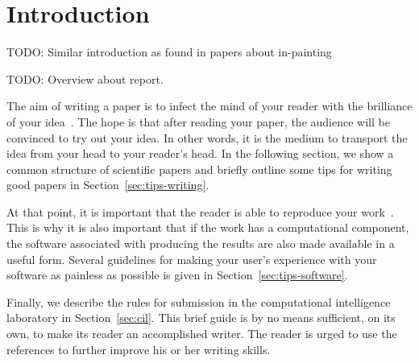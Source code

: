\section{Introduction}
\label{sec:introduction}
TODO: Similar introduction as found in papers about in-painting

TODO: Overview about report.

The aim of writing a paper is to infect the mind of your reader with
the brilliance of your idea~\cite{jones08}. 
The hope is that after reading your
paper, the audience will be convinced to try out your idea. In other
words, it is the medium to transport the idea from your head to your
reader's head. 
In the following
section, we show a common structure of scientific papers and briefly
outline some tips for writing good papers in
Section~\ref{sec:tips-writing}.

At that
point, it is important that the reader is able to reproduce your
work~\cite{schwab00,wavelab,gentleman05}. This is why it is also
important that if the work has a computational component, the software
associated with producing the results are also made available in a
useful form. Several guidelines for making your user's experience with
your software as painless as possible is given in
Section~\ref{sec:tips-software}.

Finally, we describe the rules for submission in the computational
intelligence laboratory in Section~\ref{sec:cil}. 
This brief guide is by no means sufficient, on its own, to
make its reader an accomplished writer. The reader is urged to use the
references to further improve his or her writing skills.